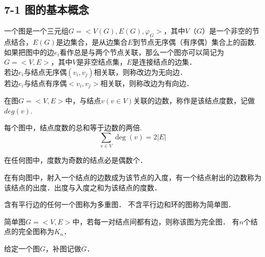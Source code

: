 
\subsection{7-1 图的基本概念}
\begin{definition}{}
一个图是一个三元组$G=<V(G),E(G),\varphi_G>$，其中$V（G）$是一个非空的节点结合，$E(G)$是边集合，是从边集合$E$到节点无序偶（有序偶）集合上的函数.
如果把图中的边$e_i$看作总是与两个节点关联，那么一个图亦可以简记为$G=<V,E>$，其中$V$是非空结点集，$E$是连接结点的边集．\\
若边$e_i$与结点无序偶$(v_i,v_j)$相关联，则称改边为无向边．\\
若边$e_i$与结点有序偶$<v_i,v_j>$相关联，则称改边为有向边．
\end{definition}
\begin{definition}{}
在图$G=<V,E>$中，与结点$v(v \in V)$关联的边数，称作是该结点度数，记做$deg(v)$.
\end{definition}
\begin{theorem}{}
每个图中，结点度数的总和等于边数的两倍.
$$\sum\limits _ { v \in V } \operatorname { deg } ( v ) = 2 | E |$$
\end{theorem}
\begin{theorem}{}
在任何图中，度数为奇数的结点必是偶数个．
\end{theorem}
\begin{definition}{}
在有向图中，射入一个结点的边数成为该节点的入度，有一个结点射出的边数称为该结点的出度．出度与入度之和为该结点的度数．
\end{definition}
\begin{definition}{}
含有平行边的任何一个图称为多重图．
不含平行边和环的图称为简单图．
\end{definition}

\begin{definition}{}
简单图$G=<V,E>$中，若每一对结点间都有边，则称该图为完全图．
有$n$个结点的完全图称为$K_n$．
\end{definition}
\begin{definition}{}
给定一个图$G，补图记做\overline { G }$．
\end{definition}


